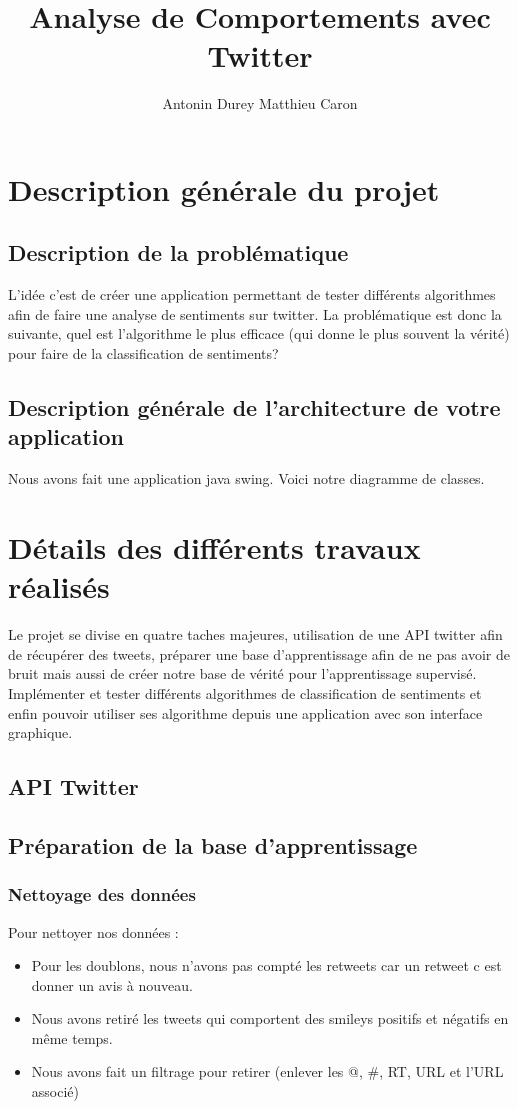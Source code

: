 \documentclass[a4paper,10pt]{report}
\title{Analyse de Comportements avec Twitter}
\author{Antonin Durey Matthieu Caron}
\begin{document}
\maketitle

\chapter{Description générale du projet}
  \section{Description de la problématique}
    L'idée c'est de créer une application permettant de tester différents algorithmes
    afin de faire une analyse de sentiments sur twitter. La problématique est donc la suivante,
    quel est l'algorithme le plus efficace (qui donne le plus souvent la vérité) pour faire de la 
    classification de sentiments?
  \section{Description générale de l'architecture de votre application}
    Nous avons fait une application java swing. Voici notre diagramme de classes.
\chapter{Détails des différents travaux réalisés}
  Le projet se divise en quatre taches majeures, utilisation de une API twitter afin de récupérer 
  des tweets, préparer une base d'apprentissage afin de ne pas avoir de bruit mais aussi de créer notre 
  base de vérité pour l'apprentissage supervisé. Implémenter et tester différents algorithmes de classification de sentiments et
  enfin pouvoir utiliser ses algorithme depuis une application avec son interface graphique.
  \section{API Twitter}
  \section{Préparation de la base d'apprentissage}
    \subsection{Nettoyage des données}
      Pour nettoyer nos données :
      \begin{itemize}
       \item Pour les doublons, nous n'avons pas compté les retweets car un retweet c est donner un avis à nouveau.
       \item Nous avons retiré les tweets qui comportent des smileys positifs et négatifs en même temps.
       \item Nous avons fait un filtrage pour retirer  (enlever les @,  \#,  RT,  URL  et  l’URL  associé)
      \end{itemize}
\end{document}
